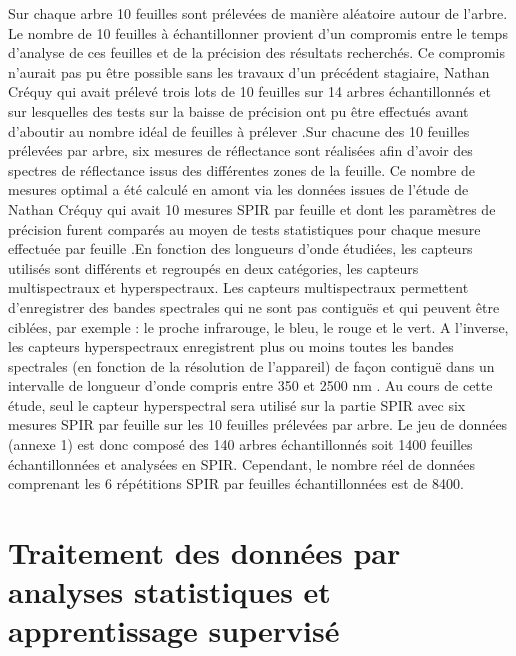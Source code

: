 \documentclass[
  11pt,
  french,
  a4paper,
  extrafontsizes,onecolumn,openright
  ]{memoir}
\begin{document}
\normalsize
\vfill
\newpage
Sur chaque arbre 10 feuilles sont prélevées de manière aléatoire autour de l'arbre. Le nombre de 10 feuilles à échantillonner provient d'un compromis entre le temps d'analyse de ces feuilles et de la précision des résultats recherchés. Ce compromis n'aurait pas pu être possible sans les travaux d'un précédent stagiaire, Nathan Créquy qui avait prélevé trois lots de 10 feuilles sur 14 arbres échantillonnés et sur lesquelles des tests sur la baisse de précision ont pu être effectués avant d'aboutir au nombre idéal de feuilles à prélever \autocite{crequy_prise_2020}.Sur chacune des 10 feuilles prélevées par arbre, six mesures de réflectance sont réalisées afin d'avoir des spectres de réflectance issus des différentes zones de la feuille. Ce nombre de mesures optimal a été calculé en amont via les données issues de l'étude de Nathan Créquy qui avait 10 mesures SPIR par feuille et dont les paramètres de précision furent comparés au moyen de tests statistiques pour chaque mesure effectuée par feuille \autocite{crequy_prise_2020}.En fonction des longueurs d'onde étudiées, les capteurs utilisés sont différents et regroupés en deux catégories, les capteurs multispectraux et hyperspectraux. Les capteurs multispectraux permettent d'enregistrer des bandes spectrales qui ne sont pas contiguës et qui peuvent être ciblées, par exemple : le proche infrarouge, le bleu, le rouge et le vert. A l'inverse, les capteurs hyperspectraux enregistrent plus ou moins toutes les bandes spectrales (en fonction de la résolution de l'appareil) de façon contiguë dans un intervalle de longueur d'onde compris entre 350 et 2500 nm \autocite{bertaux_mise_2015}. Au cours de cette étude, seul le capteur hyperspectral sera utilisé sur la partie SPIR avec six mesures SPIR par feuille sur les 10 feuilles prélevées par arbre.
Le jeu de données (annexe 1) est donc composé des 140 arbres échantillonnés soit 1400 feuilles échantillonnées et analysées en SPIR. Cependant, le nombre réel de données comprenant les 6 répétitions SPIR par feuilles échantillonnées est de 8400.

\scriptsize

\normalsize
\vfill
\newpage

\hypertarget{traitement-des-donnuxe9es-par-analyses-statistiques-et-apprentissage-supervisuxe9}{%
\section{Traitement des données par analyses statistiques et apprentissage supervisé}\label{traitement-des-donnuxe9es-par-analyses-statistiques-et-apprentissage-supervisuxe9}}
\end{document}
